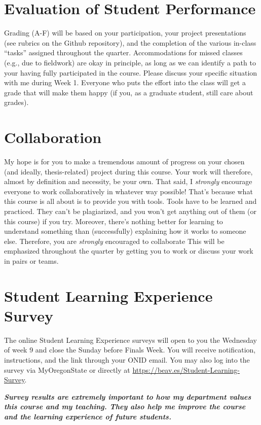 \documentclass[10pt]{article}
\begin{document}
\section*{Evaluation of Student Performance}
Grading (A-F) will be based on your participation, your project presentations (see rubrics on the Github repository),
and the completion of the various in-class ``tasks'' assigned throughout the quarter.
Accommodations for missed classes (e.g., due to fieldwork) are okay in principle, as long as we can identify a path to your having fully participated in the course.
Please discuss your specific situation with me during Week 1.
Everyone who puts the effort into the class will get a grade that will make them happy (if you, as a graduate student, still care about grades).

\section*{Collaboration}
My hope is for you to make a tremendous amount of progress on your chosen (and ideally, thesis-related) project during this course.
Your work will therefore, almost by definition and necessity, be your own.
That said, I \textit{strongly} encourage everyone to work collaboratively in 
whatever way possible!
That's because what this course is all about is to provide you with tools.
Tools have to be learned and practiced.
They can't be plagiarized, and you won't get anything out of them (or this course) if you try.
Moreover, there's nothing better for learning to understand something than (successfully) explaining how it works to someone else.
Therefore, you are \textit{strongly} encouraged to collaborate
This will be emphasized throughout the quarter by getting you to work or 
discuss your work in pairs or teams.

\section*{Student Learning Experience Survey}
The online Student Learning Experience surveys will open to you the 
Wednesday of week 9 and close the Sunday before Finals Week. 
You will receive notification, instructions, and the link through your ONID email. 
You may also log into the survey via MyOregonState or directly at 
\url{https://beav.es/Student-Learning-Survey}. 

\noindent
\textit{
\textbf{Survey results are extremely important to how my department values 
this course and my teaching.
They also help me improve the course and the learning experience of future 
students.}}
\end{document}
